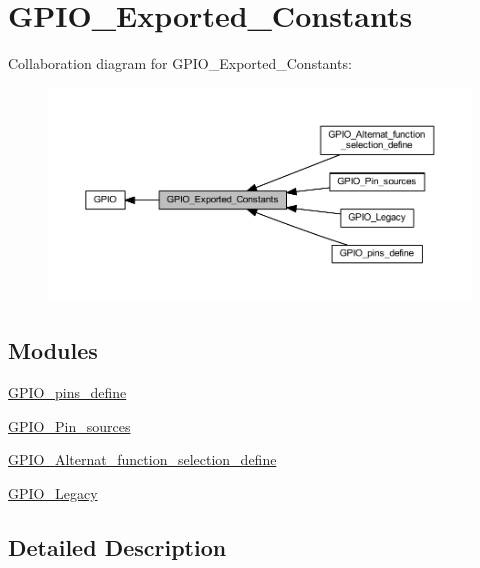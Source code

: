 \hypertarget{group___g_p_i_o___exported___constants}{}\section{G\+P\+I\+O\+\_\+\+Exported\+\_\+\+Constants}
\label{group___g_p_i_o___exported___constants}
Collaboration diagram for G\+P\+I\+O\+\_\+\+Exported\+\_\+\+Constants\+:\nopagebreak
\begin{figure}[H]
\begin{center}
\leavevmode
\includegraphics[width=350pt]{group___g_p_i_o___exported___constants}
\end{center}
\end{figure}
\subsection*{Modules}
\begin{DoxyCompactItemize}
\item 
\hyperlink{group___g_p_i_o__pins__define}{G\+P\+I\+O\+\_\+pins\+\_\+define}
\item 
\hyperlink{group___g_p_i_o___pin__sources}{G\+P\+I\+O\+\_\+\+Pin\+\_\+sources}
\item 
\hyperlink{group___g_p_i_o___alternat__function__selection__define}{G\+P\+I\+O\+\_\+\+Alternat\+\_\+function\+\_\+selection\+\_\+define}
\item 
\hyperlink{group___g_p_i_o___legacy}{G\+P\+I\+O\+\_\+\+Legacy}
\end{DoxyCompactItemize}


\subsection{Detailed Description}
